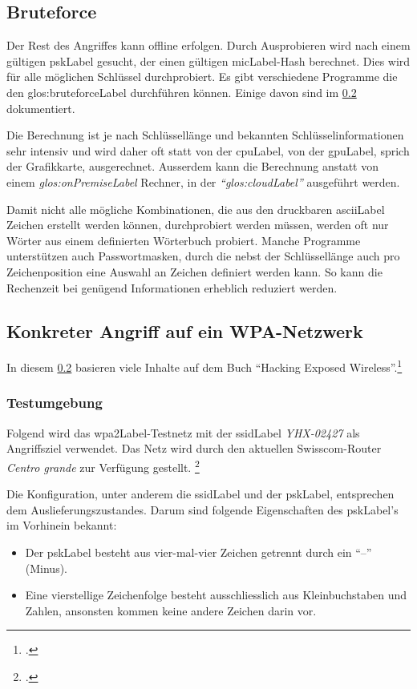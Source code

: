 \subsection{Bruteforce}
Der Rest des Angriffes kann offline erfolgen. Durch Ausprobieren wird nach einem gültigen \gls{pskLabel} gesucht, der einen gültigen \gls{micLabel}-Hash berechnet. Dies wird für alle möglichen Schlüssel durchprobiert.
Es gibt verschiedene Programme die den \gls{glos:bruteforceLabel} durchführen können.
Einige davon sind im \cref{subsec:wpa_attack_tutorial} dokumentiert.

Die Berechnung ist je nach Schlüssellänge und bekannten Schlüsselinformationen sehr intensiv und wird daher oft statt von der \gls{cpuLabel}, von der \gls{gpuLabel}, sprich der Grafikkarte, ausgerechnet.
Ausserdem kann die Berechnung anstatt von einem \textit{\gls{glos:onPremiseLabel}} Rechner, in der \textit{"`\gls{glos:cloudLabel}"'} ausgeführt werden.

Damit nicht alle mögliche Kombinationen, die aus den druckbaren \gls{asciiLabel} Zeichen erstellt werden können, durchprobiert werden müssen, werden oft nur Wörter aus einem definierten Wörterbuch probiert.
Manche Programme unterstützen auch Passwortmasken, durch die nebst der Schlüssellänge auch pro Zeichenposition eine Auswahl an Zeichen definiert werden kann. So kann die Rechenzeit bei genügend Informationen erheblich reduziert werden.


\subsection{Konkreter Angriff auf ein WPA-Netzwerk}
\label{subsec:wpa_attack_tutorial}

In diesem \cref{subsec:wpa_attack_tutorial} basieren viele Inhalte auf dem Buch "`Hacking Exposed Wireless"'.\footcite[][148f.]{WrightCache201503}

\subsubsection{Testumgebung}

Folgend wird das \gls{wpa2Label}-Testnetz mit der \gls{ssidLabel} \textit{YHX-02427} als Angriffsziel verwendet.
Das Netz wird durch den aktuellen Swisscom-Router \textit{Centro grande} zur Verfügung gestellt. \footcite{Centro_grande_Analog_Standard_-_WLAN_Router_Swisscom_2015-04-15}

Die Konfiguration, unter anderem die \gls{ssidLabel} und der \gls{pskLabel}, entsprechen dem Auslieferungszustandes.
Darum sind folgende Eigenschaften des \gls{pskLabel}'s im Vorhinein bekannt:
\begin{itemize}
	\item Der \gls{pskLabel} besteht aus vier-mal-vier Zeichen getrennt durch ein "`--"' (Minus).
	\item Eine vierstellige Zeichenfolge besteht ausschliesslich aus Kleinbuchstaben und Zahlen, ansonsten kommen keine andere Zeichen darin vor.
\end{itemize}

